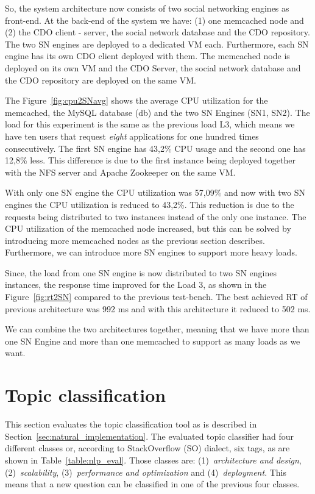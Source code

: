 So, the system architecture now consists of two social networking engines as front-end. At the back-end of the system we have: (1) one memcached node and (2) the CDO client - server, the social network database and the CDO repository. The two SN engines are deployed to a dedicated VM each. Furthermore, each SN engine has its own CDO client deployed with them. The memcached node is deployed on its own VM and the CDO Server, the social network database and the CDO repository are deployed on the same VM.

The Figure~\ref{fig:cpu2SNavg} shows the average CPU utilization for the memcached, the MySQL database (db) and the two SN Engines (SN1, SN2). The load for this experiment is the same as the previous load L3, which means we have ten users that request \emph{eight} applications for one hundred times consecutively. The first SN engine has 43,2\% CPU usage and the second one has 12,8\% less. This difference is due to the first instance being deployed together with the NFS server and Apache Zookeeper on the same VM. 

With only one SN engine the CPU utilization was 57,09\% and now with two SN engines the CPU utilization is reduced to 43,2\%. This reduction is due to the requests being distributed to two instances instead of the only one instance. The CPU utilization of the memcached node increased, but this can be solved by introducing more memcached nodes as the previous section describes. Furthermore, we can introduce more SN engines to support more heavy loads.

Since, the load from one SN engine is now distributed to two SN engines instances, the response time improved for the Load 3, as shown in the Figure~\ref{fig:rt2SN} compared to the previous test-bench. The best achieved RT of previous architecture was 992 ms and with this architecture it reduced to 502 ms.

We can combine the two architectures together, meaning that we have more than one SN Engine and more than one memcached to support as many loads as we want.

\section{Topic classification}
\label{sec:nlp_evaluation}
This section evaluates the topic classification tool as is described in Section~\ref{sec:natural_implementation}. The evaluated topic classifier had four different classes or, according to StackOverflow (SO) dialect, six tags, as are shown in Table~\ref{table:nlp_eval}. Those classes are: (1)~\emph{architecture and design}, (2)~\emph{scalability}, (3)~\emph{performance and optimization} and (4)~\emph{deployment}. This means that a new question can be classified in one of the previous four classes.

